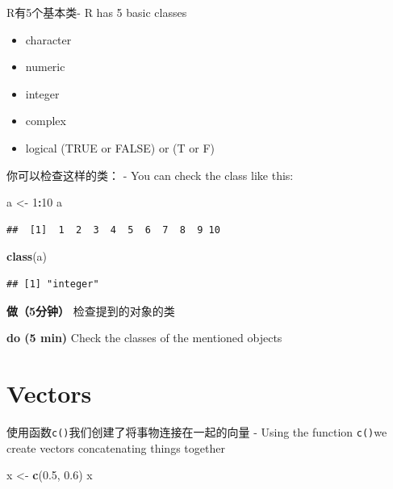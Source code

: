 \documentclass[]{book}
\newenvironment{Shaded}{\begin{snugshade}}{\end{snugshade}}
\newcommand{\DecValTok}[1]{\textcolor[rgb]{0.00,0.00,0.81}{#1}}
\newcommand{\FloatTok}[1]{\textcolor[rgb]{0.00,0.00,0.81}{#1}}
\newcommand{\KeywordTok}[1]{\textcolor[rgb]{0.13,0.29,0.53}{\textbf{#1}}}
\newcommand{\NormalTok}[1]{#1}
\newcommand{\OperatorTok}[1]{\textcolor[rgb]{0.81,0.36,0.00}{\textbf{#1}}}
\newcommand{\StringTok}[1]{\textcolor[rgb]{0.31,0.60,0.02}{#1}}
\providecommand{\tightlist}{%
  \setlength{\itemsep}{0pt}\setlength{\parskip}{0pt}}
\begin{document}
R有5个基本类- R has 5 basic classes

\begin{itemize}
\tightlist
\item
  character
\item
  numeric
\item
  integer
\item
  complex
\item
  logical (TRUE or FALSE) or (T or F)
\end{itemize}

你可以检查这样的类： - You can check the class like this:

\begin{Shaded}
\begin{Highlighting}[]
\NormalTok{a <-}\StringTok{ }\DecValTok{1}\OperatorTok{:}\DecValTok{10}
\NormalTok{a}
\end{Highlighting}
\end{Shaded}

\begin{verbatim}
##  [1]  1  2  3  4  5  6  7  8  9 10
\end{verbatim}

\begin{Shaded}
\begin{Highlighting}[]
\KeywordTok{class}\NormalTok{(a)}
\end{Highlighting}
\end{Shaded}

\begin{verbatim}
## [1] "integer"
\end{verbatim}

\textbf{做（5分钟）}
检查提到的对象的类

\textbf{do (5 min)}
Check the classes of the mentioned objects

\hypertarget{vectors}{%
\section{Vectors}\label{vectors}}

使用函数\texttt{c()}我们创建了将事物连接在一起的向量 - Using the function \texttt{c()}we create vectors concatenating things together

\begin{Shaded}
\begin{Highlighting}[]
\NormalTok{x <-}\StringTok{ }\KeywordTok{c}\NormalTok{(}\FloatTok{0.5}\NormalTok{, }\FloatTok{0.6}\NormalTok{)}
\NormalTok{x}
\end{Highlighting}
\end{Shaded}
\end{document}
